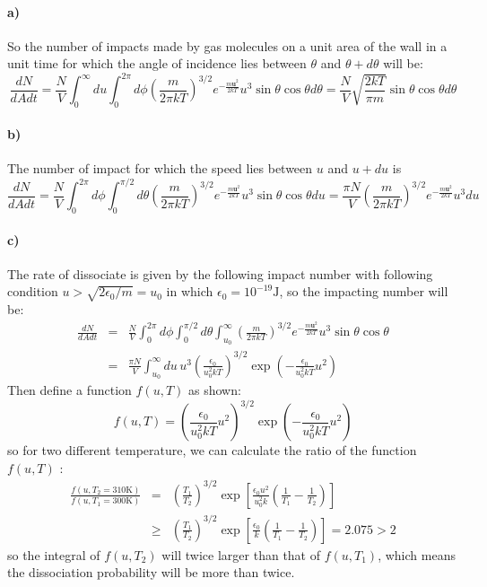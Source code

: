 \documentclass{article}
\begin{document}
\paragraph{a)}
So the number of impacts made by gas molecules on a unit area of the wall in a unit time for which the angle of incidence lies between $\theta$ and $\theta + d\theta$ will be:
\begin{equation}
\frac{dN}{dAdt} = \frac{N}{V}\int_0^\infty du\int_0^{2\pi} d\phi \left(\frac{m}{2\pi kT}\right)^{3/2}e^{-\frac{m\mathbf{u}^2}{2kT}}u^3\sin{\theta} \cos{\theta}d\theta=\frac{N}{V}\sqrt{\frac{2kT}{\pi m}}\sin\theta\cos\theta d\theta
\end{equation}
\paragraph{b)}The number of impact for which the speed lies between $u$ and $u + du$ is
\begin{equation}
\frac{dN}{dAdt} = \frac{N}{V}\int_0^{2\pi}d\phi \int_0^{\pi/2}d\theta \left(\frac{m}{2\pi kT}\right)^{3/2}e^{-\frac{m\mathbf{u}^2}{2kT}}u^3\sin{\theta} \cos{\theta}du=\frac{\pi N}{V} \left(\frac{m}{2\pi kT}\right)^{3/2}e^{-\frac{m\mathbf{u}^2}{2kT}}u^3 du
\end{equation}
\paragraph{c)}
The rate of dissociate is given by the following impact number with following condition $u> \sqrt{2\epsilon_0/m} = u_0$ in which $\epsilon_0 = 10^{-19}\mathrm{J}$, so the impacting number will be:
\begin{eqnarray}
\frac{dN}{dAdt} &=& \frac{N}{V}\int_0^{2\pi}d\phi \int_0^{\pi/2}d\theta \int_{u_0}^\infty \left(\frac{m}{2\pi kT}\right)^{3/2}e^{-\frac{m\mathbf{u}^2}{2kT}}u^3\sin{\theta} \cos{\theta}\nonumber\\
&=&\frac{\pi N}{V}\int_{u_0}^\infty du\,u^3\left(\frac{\epsilon_0}{u_0^2 kT}\right)^{3/2}\exp{\left(-\frac{\epsilon_0}{u_0^2 kT}u^2\right)}
\end{eqnarray}
Then define a function $f(u,T)$ as shown:
$$
f(u,T) = \left(\frac{\epsilon_0}{u_0^2 kT}u^2\right)^{3/2}\exp{\left(-\frac{\epsilon_0}{u_0^2 kT}u^2\right)}
$$
so for two different temperature, we can calculate the ratio of the function $f(u,T)$ :
\begin{eqnarray}
\frac{f(u,T_2 = 310\mathrm{K})}{f(u,T_1 = 300\mathrm{K})}& =& \left(\frac{T_1}{T_2}\right)^{3/2}\exp\left[\frac{\epsilon_0 u^2}{u_0^2k}\left(\frac{1}{T_1}-\frac{1}{T_2}\right)\right]\nonumber\\
&\geq&\left(\frac{T_1}{T_2}\right)^{3/2}\exp\left[\frac{\epsilon_0}{k}\left(\frac{1}{T_1}-\frac{1}{T_2}\right)\right]=2.075> 2
\end{eqnarray}
so the integral of $f(u,T_2)$ will twice larger than that of $f(u,T_1)$, which means the dissociation probability will be more than twice.
\end{document}
